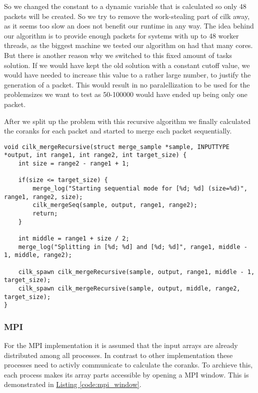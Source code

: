 So we changed the constant to a dynamic variable that is calculated so only 48 packets will be created. So we try to remove the work-stealing part of cilk away, as it seems too slow an does not benefit our runtime in any way. The idea behind our algorithm is to provide enough packets for systems with up to 48 worker threads, as the biggest machine we tested our algorithm on had that many cores.
But there is another reason why we switched to this fixed amount of tasks solution. If we would have kept the old solution with a constant cutoff value, we would have needed to increase this value to a rather large number, to justify the generation of a packet. This would result in no paralellization to be used for the problemsizes we want to test as 50-100000 would have ended up being only one packet.

After we split up the problem with this recursive algorithm we finally calculated the coranks for each packet and started to merge each packet sequentially.

\begin{lstlisting}[caption=recursive cilk strategy, label=code:cilk_recursion, style=c]
void cilk_mergeRecursive(struct merge_sample *sample, INPUTTYPE *output, int range1, int range2, int target_size) {
	int size = range2 - range1 + 1;
	
	if(size <= target_size) {
		merge_log("Starting sequential mode for [%d; %d] (size=%d)", range1, range2, size);
		cilk_mergeSeq(sample, output, range1, range2);
		return;
	}
	
	int middle = range1 + size / 2;
	merge_log("Splitting in [%d; %d] and [%d; %d]", range1, middle - 1, middle, range2);
	
	cilk_spawn cilk_mergeRecursive(sample, output, range1, middle - 1, target_size);
	cilk_spawn cilk_mergeRecursive(sample, output, middle, range2, target_size);
}
\end{lstlisting}

\subsubsection{MPI}
For the MPI implementation it is assumed that the input arrays are already distributed among all processes.
In contrast to other implementation these processes need to activly communicate to calculate the coranks.
To archieve this, each process makes its array parts accessible by opening a MPI window.
This is demonstrated in \hyperref[code:mpi_window]{Listing \ref*{code:mpi_window}}.


